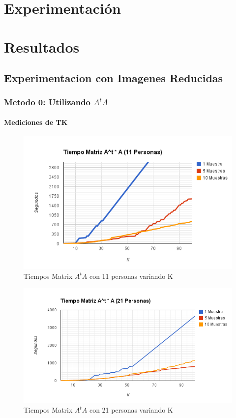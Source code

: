 \section{Experimentación}


\section{Resultados}
\subsection{Experimentacion con Imagenes Reducidas}
\subsubsection{Metodo 0: Utilizando $A^tA$}
\paragraph{Mediciones de TK}
\begin{figure}[H]
\includegraphics[width=1\textwidth]{img/image1.png}
     \caption{Tiempos Matrix $A^tA$ con 11 personas variando K}
     \label{fig:figura1}
\end{figure}

\begin{figure}[H]
\includegraphics[width=1\textwidth]{img/image2.png}
     \caption{Tiempos Matrix $A^tA$ con 21 personas variando K}
     \label{fig:figura1}
\end{figure}

